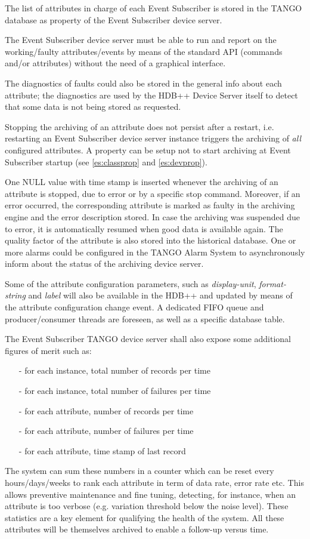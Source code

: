 \documentclass[11pt,a4paper]{article}
\def \hdb{HDB++}
\def \es{Event Subscriber}
\def \tango{TANGO}
\begin{document}
The list of attributes in charge of each Event Subscriber is
stored in the \tango{} database as property of the \es{} device
server.

The \es{} device server must be able to run and report
on the working/faulty attributes/events by means of the standard
API (commands and/or attributes) without the need of a graphical
interface.

The diagnostics of faults could also be stored in the general
info about each attribute; the diagnostics are used by
the \hdb{} Device Server itself to detect that some data is not
being stored as requested.

Stopping the archiving of an attribute does not persist after a
restart, i.e. restarting an \es{} device server instance
triggers the archiving of \emph{all} configured attributes.
A property can be setup not to start archiving at \es{} startup
(see \ref{es:classprop} and \ref{es:devprop}).

One NULL value with time stamp is inserted whenever the archiving
of an attribute is stopped, due to error or by a specific stop
command. Moreover, if an error occurred, the corresponding attribute
is marked as faulty in the archiving engine and the error description
stored. In case the archiving was suspended due to error, it is
automatically resumed when good data is available again.
The quality factor of the attribute is also stored into the historical
database.
One or more alarms could be configured in the \tango{} Alarm System
to asynchronously inform about the status of the archiving device
server.

Some of the attribute configuration parameters, such as \emph{display-unit},
\emph{format-string} and \emph{label} will also be available in the \hdb{}
and updated by means of the attribute configuration change event.
A dedicated FIFO queue and producer/consumer threads are foreseen, as
well as a specific database table.

The \es{} \tango{} device server shall also expose some
additional figures of merit such as:
\begin{itemize}
	\item[-] for each instance, total number of records per time
	\item[-] for each instance, total number of failures per time
	\item[-] for each attribute, number of records per time
	\item[-] for each attribute, number of failures per time
	\item[-] for each attribute, time stamp of last record
\end{itemize}
The system can sum these numbers in a counter which can be reset
every \mbox{hours/days/weeks} to rank each attribute in term of
data rate, error rate etc. This allows preventive maintenance
and fine tuning, detecting, for instance, when an attribute is
too verbose (e.g. variation threshold below the noise level).
These statistics are a key element for qualifying the health
of the system. All these attributes will be themselves archived
to enable a follow-up versus time.
\end{document}
